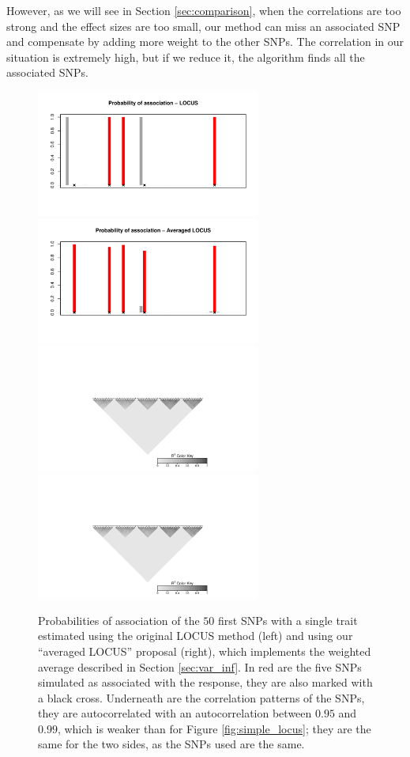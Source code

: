 \documentclass[a4paper, 11pt]{report}
\numberwithin{equation}{chapter}
\begin{document}
However, as we will see in Section \ref{sec:comparison}, when the correlations are too strong and the effect sizes are too small, our method can miss an associated SNP and compensate by adding more weight to the other SNPs. The correlation in our situation is extremely high, but if we reduce it, the algorithm finds all the associated SNPs.

\begin{figure}[h]
\centering
\includegraphics[width=2.9in, bb= 0 0 8in 4in]{images/proba_weak.pdf}
\includegraphics[width=2.9in, bb= 0 0 8in 4in]{images/proba_weak_m.pdf}
\includegraphics[width=2.9in, bb= 1.32in 0 6.4in 2in]{images/LD_weak.pdf}
\includegraphics[width=2.9in, bb= 1.32in 0 6.4in 2in]{images/LD_weak.pdf}
\caption{\label{fig:weaker_locus}Probabilities of association of the $50$ first SNPs with a single trait estimated using the original LOCUS method (left) and using our ``averaged LOCUS'' proposal (right), which implements the weighted average described in Section \ref{sec:var_inf}. In red are the five SNPs simulated as associated with the response, they are also marked with a black cross. Underneath are the correlation patterns of the SNPs, they are autocorrelated with an autocorrelation between $0.95$ and $0.99$, which is weaker than for Figure \ref{fig:simple_locus}; they are the same for the two sides, as the SNPs used are the same.}
\end{figure}
\end{document}
